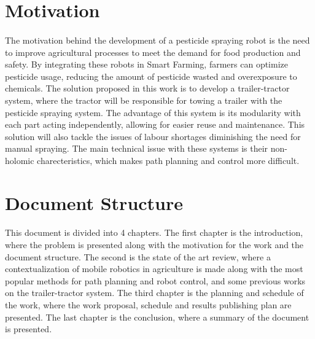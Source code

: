 \section{Motivation}
\label{sec:motivation}
\paragraph{}The motivation behind the development of a pesticide spraying robot is the need to improve agricultural 
processes to meet the demand for food production and safety. By integrating these robots in Smart Farming, 
farmers can optimize pesticide usage, reducing the amount of pesticide wasted and overexposure to 
chemicals. The solution proposed in this work is to develop a trailer-tractor system, where the tractor will be responsible for 
towing a trailer with the pesticide spraying system. The advantage of this system is its modularity with each part acting 
independently, allowing for easier reuse and maintenance. This solution will also tackle the issues of labour 
shortages diminishing the need for manual spraying. The main technical issue with these systems is their non-holomic 
charecteristics, which makes path planning and control more difficult.


\section{Document Structure}
\label{sec:documentstruct}
\paragraph{}This document is divided into 4 chapters. The first chapter is the introduction, 
where the problem is presented along with the motivation for the work and the document structure. 
The second is the state of the art review, where a contextualization of mobile robotics in agriculture is made 
along with the most popular methods for path planning and robot control, and some previous works 
on the trailer-tractor system. The third chapter is the planning and schedule of the work, 
where the work proposal, schedule and results publishing plan are presented. The last chapter is the 
conclusion, where a summary of the document is presented.